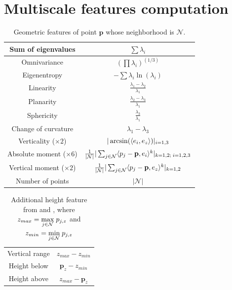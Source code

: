 \documentclass[a4paper, 11pt]{article}
\begin{document}
\appendix

\section{Multiscale features computation}
\begin{table}[H]
    \centering
    \begin{tabular}{|c||c|}
    \hline   
    Sum of eigenvalues & $\sum \lambda_i$ \\[1ex]
    \hline
    Omnivariance & $(\prod \lambda_i)^{(1/3)}$\\[1ex]
    \hline
    Eigenentropy & $-\sum \lambda_i \ln(\lambda_i)$\\[1ex]
    \hline
    Linearity & $\frac{\lambda_1 - \lambda_2}{\lambda_1}$\\[1ex]
    \hline
    Planarity & $\frac{\lambda_2 - \lambda_3}{\lambda_1}$\\[1ex]
    \hline
    Sphericity & $\frac{\lambda_3}{\lambda_1}$\\[1ex]
    \hline
    Change of curvature & $\lambda_1 - \lambda_3$\\[1ex]
    \hline
    Verticality ($\times2$) & $|\arcsin(\langle e_i, e_z \rangle)|_{i=1, 3}$ \\[1ex]
    \hline
    Absolute moment ($\times6$) & $\frac{1}{|\mathcal{N}|}|\sum_{j\in\mathcal{N}} \langle p_j - \mathbf{p}, e_i \rangle^k|_{k = 1, 2;\; i = 1, 2, 3}$\\[1ex]
    \hline  
    Vertical moment ($\times2$) & $\frac{1}{|\mathcal{N}|}|\sum_{j\in\mathcal{N}} \langle p_j - \mathbf{p}, e_z \rangle^k|_{k=1, 2}$ \\[1ex]
    \hline
    Number of points & $|\mathcal{N}|$\\[1ex]
    \hline
    \end{tabular}
    \caption{Geometric features \cite{thomas_semantic_2018} of point $\mathbf{p}$ whose neighborhood is $\mathcal{N}$.}
    \label{tab:thomas_feat}
\end{table}
\begin{table}[H]
    \centering
    \begin{tabular}{|c||c|}
        \hline
        Vertical range & $z_{max} - z_{min} $\\[1ex]
        Height below & $\mathbf{p}_z - z_{min} $ \\[1ex]
        Height above & $z_{max} - \mathbf{p}_z$\\[1ex]
        \hline
    \end{tabular}
    \caption{Additional height feature from \cite{hackel_fast_nodate} and \cite{mohamed_improvement_2022}, where $z_{max} = \underset{j\in\mathcal{N}}{\max}\;p_{j,z}$ and $z_{min} = \underset{j\in\mathcal{N}}{\min}\; p_{j,z}$}
\end{table}
\end{document}
